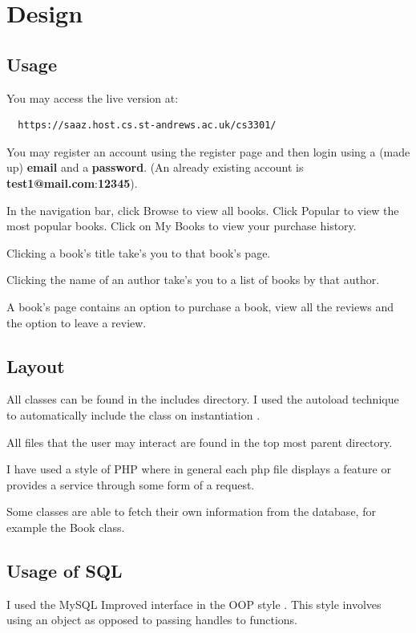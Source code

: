 \documentclass{article}
\begin{document}
\section{Design}

\subsection{Usage}

You may access the live version at:

\begin{lstlisting}
  https://saaz.host.cs.st-andrews.ac.uk/cs3301/
\end{lstlisting}

You may register an account using the register page and then login using a (made up) \textbf{email} and a \textbf{password}. (An already existing account is \textbf{test1@mail.com}:\textbf{12345}).

In the navigation bar, click Browse to view all books. Click Popular to view the most popular books. Click on My Books to view your purchase history.

Clicking a book's title take's you to that book's page.

Clicking the name of an author take's you to a list of books by that author.

A book's page contains an option to purchase a book, view all the reviews and the option to leave a review.

\subsection{Layout}

All classes can be found in the includes directory. I used the autoload technique to automatically include the class on instantiation \cite{php-autoload}.

All files that the user may interact are found in the top most parent directory.

I have used a style of PHP where in general each php file displays a feature or provides a service through some form of a request.

Some classes are able to fetch their own information from the database, for example the Book class.

\subsection{Usage of SQL}

I used the MySQL Improved interface in the OOP style \cite{php-mysqli}. This style involves using an object as opposed to passing handles to functions.
\end{document}
